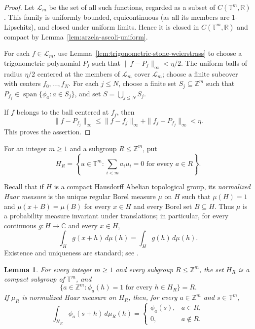 \documentclass[10pt,a4paper]{amsart}
\newtheorem{lemma}[theorem]{Lemma}
\newcommand{\T}{\mathbb T}
\newcommand{\Z}{\mathbb Z}
\begin{document}
\begin{proof}
Let $\mathcal L_m$ be the set of all such functions, regarded as a subset of
$C(\T^m,\mathbb R)$.  This family is uniformly bounded, equicontinuous (as
all its members are $1$-Lipschitz), and closed under uniform limits.  Hence it
is closed in $C(\T^m,\mathbb R)$ and compact by
Lemma~\ref{lem:arzela-ascoli-uniform}.

For each $f\in\mathcal L_m$, use
Lemma~\ref{lem:trigonometric-stone-weierstrass} to choose a trigonometric
polynomial $P_f$ such that $\|f-P_f\|_\infty<\eta/2$.  The uniform balls of
radius $\eta/2$ centered at the members of $\mathcal L_m$ cover
$\mathcal L_m$; choose a finite subcover with centers
$f_0,\ldots,f_N$.
For each $j\leq N$, choose a finite set $S_j\subseteq\Z^m$ such that
$P_{f_j}\in\operatorname{span}\{\phi_a:a\in S_j\}$, and set
$S=\bigcup_{j\leq N} S_j$.

If $f$ belongs to the ball centered at $f_j$, then
\[
 \|f-P_{f_j}\|_\infty
 \leq \|f-f_j\|_\infty+\|f_j-P_{f_j}\|_\infty<\eta.
\]
This proves
the assertion.
\end{proof}

For an integer $m\geq1$ and a subgroup $R\leq\Z^m$, put
\[
 H_R=\left\{u\in\T^m:\sum_{i<m}a_i u_i=0
                    \text{ for every }a\in R\right\}.
\]

Recall that if $H$ is a compact Hausdorff Abelian topological group, its
\emph{normalized Haar measure} is the unique regular Borel measure $\mu$
on $H$ such that $\mu(H)=1$ and
$\mu(x+B)=\mu(B)$ for every $x\in H$ and every Borel set $B\subseteq H$.
Thus $\mu$ is a probability measure invariant under translations; in
particular, for every continuous $g:H\to\mathbb C$ and every $x\in H$,
\[
 \int_H g(x+h)\,d\mu(h)=\int_H g(h)\,d\mu(h).
\]
Existence and uniqueness are standard; see
\cite[Chapter~VII, \S\S~2--3]{Katznelson2004}.

\begin{lemma}
\label{lem:annihilator-haar-average}
For every integer $m\geq1$ and every subgroup $R\leq\Z^m$, the set $H_R$ is
a compact subgroup of $\T^m$, and
\begin{equation}\label{eq:double-annihilator}
 \{a\in\Z^m:\phi_a(h)=1\text{ for every }h\in H_R\}=R.
\end{equation}
If $\mu_R$ is normalized Haar measure on $H_R$, then, for every
$a\in\Z^m$ and $s\in\T^m$,
\begin{equation}\label{eq:haar-homomorphism-average}
 \int_{H_R}\phi_a(s+h)\,d\mu_R(h)
 =\begin{cases}
   \phi_a(s),&a\in R,\\
   0,&a\notin R.
  \end{cases}
\end{equation}
\end{lemma}
\end{document}
